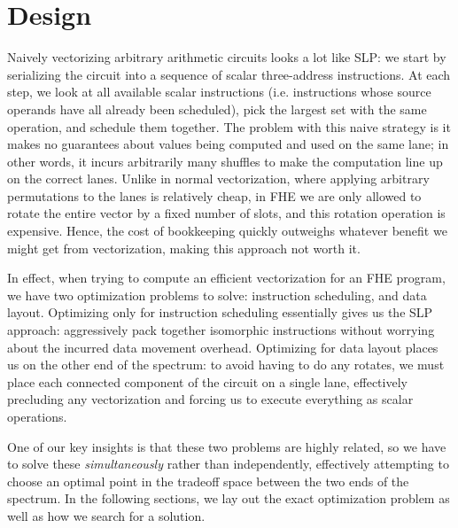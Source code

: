 \section{Design}\label{sec:design}
Naively vectorizing arbitrary arithmetic circuits looks a lot like SLP: we start by serializing the circuit into a sequence of scalar three-address instructions.
At each step, we look at all available scalar instructions (i.e. instructions whose source operands have all already been scheduled), pick the largest set with the same operation, and schedule them together.
The problem with this naive strategy is it makes no guarantees about values being computed and used on the same lane; in other words, it incurs arbitrarily many shuffles to make the computation line up on the correct lanes.
Unlike in normal vectorization, where applying arbitrary permutations to the lanes is relatively cheap, in FHE we are only allowed to rotate the entire vector by a fixed number of slots, and this rotation operation is expensive.
Hence, the cost of bookkeeping quickly outweighs whatever benefit we might get from vectorization, making this approach not worth it.

In effect, when trying to compute an efficient vectorization 
for an FHE program, we have two optimization problems to solve: instruction scheduling, and data layout.
Optimizing only for instruction scheduling essentially gives us the SLP approach: aggressively pack together isomorphic instructions without worrying about the incurred data movement overhead.
Optimizing for data layout places us on the other end of the spectrum: to avoid having to do any rotates, we must place each connected component of the circuit on a single lane, effectively precluding any vectorization and forcing us to execute everything as scalar operations.

One of our key insights is that these two problems are highly related, so we have to solve these {\em simultaneously} rather than independently, effectively attempting to choose an optimal point in the tradeoff space between the two ends of the spectrum.
In the following sections, we lay out the exact optimization problem as well as how we search for a solution. 


